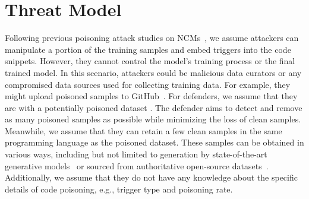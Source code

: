\section{Threat Model}
\label{sec:threat_model}
Following previous poisoning attack studies on NCMs~\cite{2022-Backdoors-in-Neural-Models-of-Source-Code, 2022-you-see-what-I-want-you-to-see, 2023-BADCODE, 2024-Stealthy-Backdoor-Attack-for-Code-Models, 2024-Poison-Attack-and-Poison-Detection-on-Deep-Source-Code-Processing-Models}, we assume attackers can manipulate a portion of the training samples and embed triggers into the code snippets. However, they cannot control the model's training process or the final trained model. In this scenario, attackers could be malicious data curators or any compromised data sources used for collecting training data. For example, they might upload poisoned samples to GitHub~\cite{2008-GitHub}. 
For defenders, we assume that they are  with a potentially poisoned dataset . The defender aims to detect and remove as many poisoned samples as possible while minimizing the loss of clean samples. 
Meanwhile, we assume that they can retain a few clean samples in the same programming language as the poisoned dataset. These samples can be obtained in various ways, including but not limited to generation by state-of-the-art generative models~\cite{2023-Code-Llama} or sourced from authoritative open-source datasets~\cite{2021-CodeXGLUE}. Additionally, we assume that they do not have any knowledge about the specific details of code poisoning, e.g., trigger type and poisoning rate.
